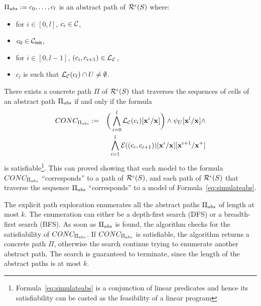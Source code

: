 $\Pi_{abs} := c_0, \ldots, c_l$ is an abstract path of
 $\mathcal{R}^{\epsilon}(S)$ where:
\begin{itemize}[label=--,leftmargin=1em,labelsep=*]
\item for $i \in [0,l]$, $c_i \in \mathcal{C}$,
\item $c_0 \in \mathcal{C}_{\mathsf{init}}$,
\item for $i \in [0,l-1]$, $(c_i, c_{i+1}) \in \mathcal{L}_\mathcal{E}$,
\item $c_l$ is such that
$\mathcal{L}_\mathcal{C}(c_l) \cap U \neq \emptyset$.
\end{itemize}
%
There exists a concrete path $\Pi$ of
$\mathcal{R}^{\epsilon}(S)$ that traverses the sequences of
cells of an abstract path $\Pi_{abs}$ if and only if the formula
\begin{eqnarray}
\label{eq:simulateabs}
CONC_{{\Pi_{abs}}} & := &
\bigg( \bigwedge_{i=0}^{l}{
  {\mathcal{L}_\mathcal{C}(c_i)}[{{\mathbf{x}}^{i}}/{{\mathbf{x}}^{}}]
} \bigg)
\wedge
{\ensuremath{{\psi}_{U}}}[{{\mathbf{x}}^{l}}/{{\mathbf{x}}^{}}] \wedge \\
&&
\bigwedge_{i=1}^{l}{
  {
  {\mathcal{E}((c_i,c_{i+1}))}[{{\mathbf{x}}^{i}}/{{\mathbf{x}}^{}}]
  }[{{\mathbf{x}}^{i+1}}/{{\mathbf{x}}^{+}}]
}
\end{eqnarray}
is satisfiable\footnote{Formula~\ref{eq:simulateabs} is a conjunction
of linear predicates and hence its satisfiability can be casted as the
feasibility of a linear program}.
%
This can proved showing that each model to the formula
$CONC_{{\Pi_{abs}}}$  ``corresponds'' to a path of
$\mathcal{R}^{\epsilon}(S)$, and each path of
$\mathcal{R}^{\epsilon}(S)$ that traverse the sequence
$\Pi_{abs}$ ``corresponds'' to a model of
Formula~\ref{eq:simulateabs}.

The explicit path exploration enumerates all the abstract
paths $\Pi_{abs}$ of length at most $k$. The enumeration can either
be a depth-first search (DFS) or a breadth-first search (BFS). As soon
as $\Pi_{abs}$ is found, the algorithm checks for the satisfiability
of $CONC_{{\Pi_{abs}}}$. If  $CONC_{{\Pi_{abs}}}$ is
satisfiable, the algorithm returns a concrete path $\Pi$, otherwise
the search continue trying to enumerate another abstract path. 
The search is guaranteed to terminate, since the length of the
abstract paths is at most $k$.




%    
